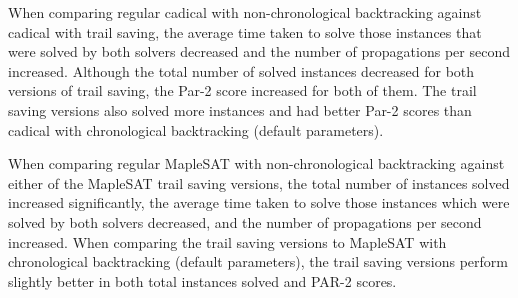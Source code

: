 \documentclass{article}
\begin{document}
When comparing regular cadical with non-chronological backtracking against cadical with trail saving, the average time taken to solve those instances that were solved by both solvers decreased and the number of propagations per second increased. Although the total number of solved instances decreased for both versions of trail saving, the Par-2 score increased for both of them. The trail saving versions also solved more instances and had better Par-2 scores than cadical with chronological backtracking (default parameters).

When comparing regular MapleSAT with non-chronological backtracking against either of the MapleSAT trail saving versions, the total number of instances solved increased significantly, the average time taken to solve those instances which were solved by both solvers decreased, and the number of propagations per second increased. When comparing the trail saving versions to MapleSAT with chronological backtracking (default parameters), the trail saving versions perform slightly better in both total instances solved and PAR-2 scores.
\end{document}
